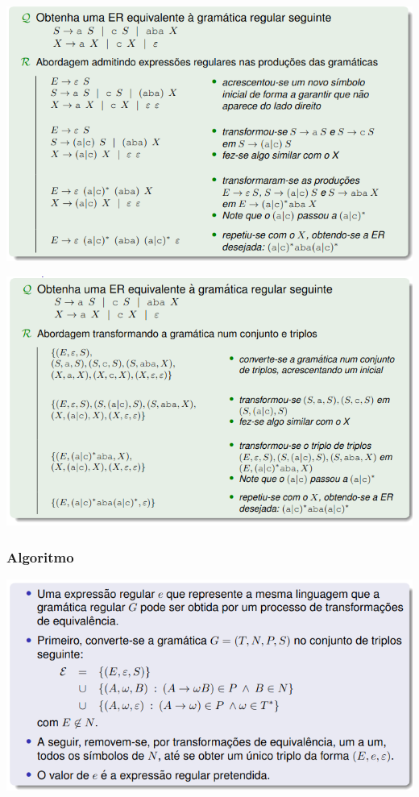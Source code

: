 \documentclass{article}
\begin{document}
\begin{flushleft}
  \begin{center}
    \includegraphics[scale=0.399]{23}
  \end{center}

  \begin{center}
    \includegraphics[scale=0.399]{24}
  \end{center}

  \pagebreak

  \subsubsection{Algoritmo}

  \begin{center}
    \includegraphics[scale=0.4]{25}
  \end{center}


\end{flushleft}
\end{document}
